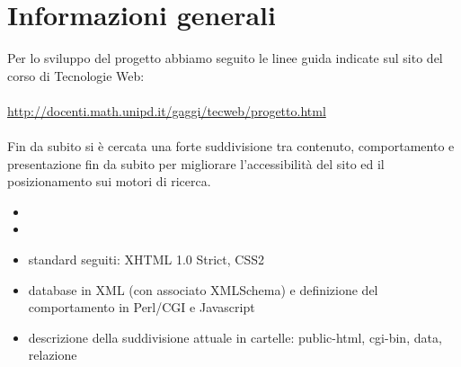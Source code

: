 \documentclass[../relazione.tex]{subfiles}
\begin{document}
\section{Informazioni generali}
	Per lo sviluppo del progetto abbiamo seguito le linee guida indicate sul sito del corso di Tecnologie Web:
	\\\\\url{http://docenti.math.unipd.it/gaggi/tecweb/progetto.html}
	\\\\Fin da subito si è cercata una forte suddivisione tra contenuto, comportamento e presentazione fin da subito per migliorare l'accessibilità del sito ed il posizionamento sui motori di ricerca.
	\begin{itemize}
		\item 
		\item 
		\item standard seguiti: XHTML 1.0 Strict, CSS2
		\item database in XML (con associato XMLSchema) e definizione del comportamento in Perl/CGI e Javascript
		\item descrizione della suddivisione attuale in cartelle: public-html, cgi-bin, data, relazione
	\end{itemize}
\end{document}
